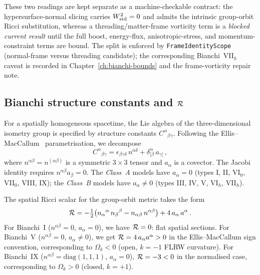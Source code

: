 These two readings are kept separate as a machine-checkable contract: the
hypersurface-normal slicing carries $W^2_{\mathrm{std}} = 0$ and admits the intrinsic
group-orbit Ricci substitution, whereas a threading/matter-frame vorticity term
is a \emph{blocked current result} until the full boost, energy-flux,
anisotropic-stress, and momentum-constraint terms are bound.  The split is
enforced by \texttt{FrameIdentityScope} (normal-frame versus threading
candidate); the corresponding Bianchi~VII$_h$ caveat is recorded in
Chapter~\ref{ch:bianchi-bounds} and the frame-vorticity repair note.


\subsection{Bianchi structure constants and $\mathcal{R}$}
\label{sec:bianchi-Rstar}

For a spatially homogeneous spacetime, the Lie algebra of the
three-dimensional isometry group is specified by structure
constants $C^\alpha{}_{\beta\gamma}$.  Following the
Ellis--MacCallum~\cite{EllisMacCallum1969} parametrisation,
we decompose
\begin{equation}\label{eq:struct-decomp}
C^{\alpha}{}_{\beta\gamma}
= \epsilon_{\beta\gamma\delta}\,n^{\alpha\delta}
  + \delta^{\alpha}_{[\beta}\,a_{\gamma]}\,,
\end{equation}
where $n^{\alpha\beta} = n^{(\alpha\beta)}$ is a symmetric
$3\times 3$ tensor and $a_\alpha$ is a covector.  The Jacobi
identity requires $n^{\alpha\beta}a_\beta = 0$.  The
\emph{Class~A} models have $a_\alpha = 0$ (types I, II,
VI$_0$, VII$_0$, VIII, IX); the \emph{Class~B} models have
$a_\alpha \neq 0$ (types III, IV, V, VI$_h$, VII$_h$).

The spatial Ricci scalar for the group-orbit metric takes the
form~\cite{EllisMacCallum1969,RyanShepley1975}
\begin{equation}\label{eq:Rstar-bianchi}
\mathcal{R} = -\tfrac{1}{2}\bigl(
n_\alpha{}^\alpha\, n_\beta{}^\beta
- n_{\alpha\beta}\,n^{\alpha\beta}\bigr)
+ 4\,a_\alpha\, a^\alpha\,.
\end{equation}
For Bianchi~I ($n^{\alpha\beta} = 0$, $a_\alpha = 0$), we have
$\mathcal{R} = 0$: flat spatial sections.  For Bianchi~V
($n^{\alpha\beta} = 0$, $a_\alpha \neq 0$), we get
$\mathcal{R} = 4\,a_\alpha a^\alpha > 0$ in the Ellis--MacCallum sign
convention, corresponding to $\Omega_k < 0$ (open, $k = -1$
FLRW curvature).  For Bianchi~IX
($n^{\alpha\beta} = \mathrm{diag}(1,1,1)$, $a_\alpha = 0$),
$\mathcal{R} = -3 < 0$ in the normalised case, corresponding to
$\Omega_k > 0$ (closed, $k = +1$).


